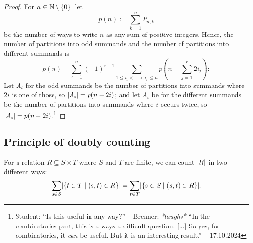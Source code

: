 \documentclass[language=english]{../../Template/TemplateLecture}
\begin{document}
\begin{proof}
    For $n \in \mathbb{N} \setminus \{0\}$, let
    \begin{equation}
        p(n) := \sum_{k = 1}^n P_{n,k}
    \end{equation}
    be the number of ways to write $n$ as any sum of positive integers. Hence, the number of partitions into odd summands and the number of partitions into different summands is 
    \begin{equation}
        p(n) - \sum_{r = 1}^n (-1)^{r-1} \sum_{1 \leq i_1 < \cdots < i_r \leq n} p\left(n - \sum_{j = 1}^r 2i_j\right):
    \end{equation}
    Let $A_i$ for the odd summands be the number of partitions into summands where $2i$ is one of those, so $\lvert A_i\rvert = p(n-2i)$; 
    and let $A_i$ be for the different summands be the number of partitions into summands where $i$ occurs twice, so $\lvert A_i\rvert = p(n-2i)$.\footnote{Student: \enquote{Is this useful in any way?} -- Brenner: \emph{*laughs*} \enquote{In the combinatorics part, this is always a difficult question. [...] So yes, for combinatorics, it \emph{can} be useful. But it is an interesting result.} -- 17.10.2024}
\end{proof}

\subsection{Principle of doubly counting}
For a relation $R \subseteq S \times T$ where $S$ and $T$ are finite, we can count $\lvert R\rvert$ in two different ways:
\begin{equation}
    \sum_{s \in S} \lvert\{t \in T \mid (s,t) \in R\}\rvert = \sum_{t \in T} \lvert\{s \in S \mid (s,t) \in R\}\rvert.
\end{equation}
\end{document}

